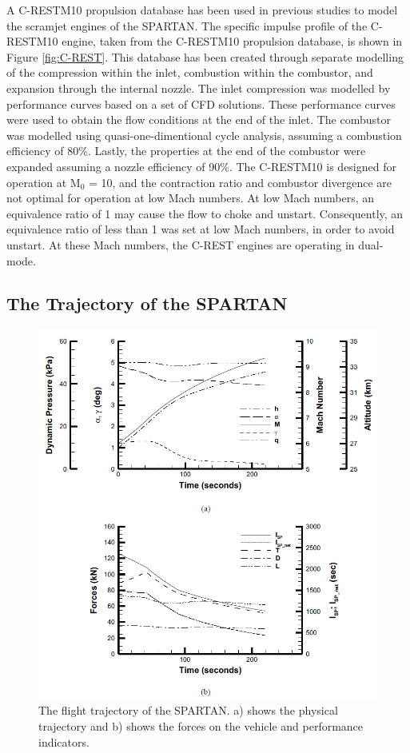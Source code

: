 A C-RESTM10 propulsion database has been used in previous studies to model the scramjet engines of the SPARTAN\cite{Preller2017b}. The specific impulse profile of the C-RESTM10 engine, taken from the C-RESTM10 propulsion database, is shown in Figure \ref{fig:C-REST}. This database has been created through separate modelling of the compression within the inlet, combustion within the combustor, and expansion through the internal nozzle\cite{Preller2018a}. The inlet compression was modelled by performance curves based on a set of CFD solutions\cite{Preller2018a}. These performance curves were used to obtain the flow conditions at the end of the inlet. The combustor was modelled using quasi-one-dimentional cycle analysis, assuming a combustion efficiency of 80\%\cite{Preller2018a}. Lastly, the properties at the end of the combustor were expanded assuming a nozzle efficiency of 90\%\cite{Preller2018a}.
The C-RESTM10 is designed for operation at M$_0$ = 10, and the contraction ratio and combustor divergence are not optimal for operation at low Mach numbers. At low Mach numbers, an equivalence ratio of 1 may cause the flow to choke and unstart. 
Consequently, an equivalence ratio of less than 1 was set at low Mach numbers, in order to avoid unstart\cite{Preller2018a}. At these Mach numbers, the C-REST engines are operating in dual-mode\cite{Preller2018a}. 







\subsection{The Trajectory of the SPARTAN}
\begin{figure}[!ht]
	\centering
	\includegraphics[width=0.9\linewidth]{figures/2_literature-review/SPARTAN_traj1}
	\caption{The flight trajectory of the SPARTAN. a) shows the physical trajectory and b) shows the forces on the vehicle and performance indicators.}
	\label{fig:SPARTAN_traj}
\end{figure}

